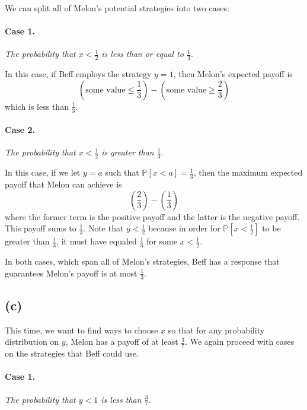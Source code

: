 \documentclass{6046}
\begin{document}
We can split all of Melon's potential strategies into two cases:
\vspace{-1em}
\paragraph{Case 1.} {\it The probability that $x < \frac{1}{2}$ is
less than or equal to $\frac{1}{3}$}.\\
\vspace{-1em}

In this case, if Beff employs the strategy $y = 1$, then
Melon's expected payoff is 
\[
    (\text{some value} \le \frac{1}{3})
  - (\text{some value} \ge \frac{2}{3})
\]
which is less than $\frac{1}{3}$.

\paragraph{Case 2.} {\it The probability that $x < \frac{1}{2}$ is
greater than $\frac{1}{3}$}.\\
\vspace{-1em}

In this case, if we let $y = a$ such that
$\mathbb{P}[x < a] = \frac{1}{3}$, then the maximum expected payoff that Melon
can achieve is 
\[
    (\frac{2}{3})
  - (\frac{1}{3})
\]
where the former term is the positive payoff and the latter
is the negative payoff. This
payoff sums to $\frac{1}{3}$. Note that $y < \frac{1}{2}$ because
in order for $\mathbb{P}[x < \frac{1}{2}]$ to be greater than
$\frac{1}{3}$, it must have equaled $\frac{1}{3}$ for some
$x < \frac{1}{2}$.

In both cases, which span all of Melon's strategies, 
Beff has a response that guarantees Melon's payoff is at most $\frac{1}{3}$.

\subsection*{(c)}
This time, we want to find ways to choose $x$ so that for any
probability distribution on $y$, Melon has a payoff of at least
$\frac{3}{7}$. We again proceed with cases on the
strategies that Beff could use.
\vspace{-1em}

\paragraph{Case 1.} {\it
The probability that $y < 1$ is less than $\frac{3}{7}$.
}
\end{document}
